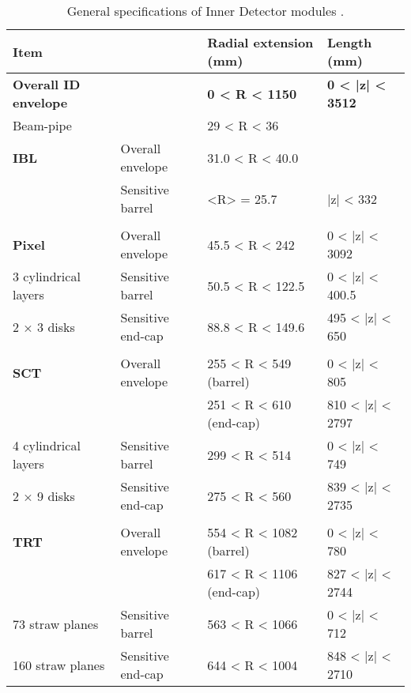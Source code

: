 \begin{table} \centering
\caption{General specifications of Inner Detector modules \cite{atlas_tdr} \cite{insertable_Blayer}.}
\label{tab:ID_specs}
\begin{tabular}{ |l l|l|l| }
    \hline
    \textbf{Item}                   & &       \textbf{Radial extension (mm)} & \textbf{Length (mm)} \\
    \hline
    \textbf{Overall ID envelope}    & &         \textbf{0 < R < 1150}        &\textbf{0 < |z| < 3512} \\
    Beam-pipe                       & &            29 < R < 36    & \\
    \hline

    \textbf{IBL}          &  Overall envelope  &  31.0 < R < 40.0          &             \\    
                          &  Sensitive barrel  &  <R> = 25.7               &  |z| < 332 \\    
    &&&\\
    \textbf{Pixel}        &  Overall envelope  &  45.5 < R < 242           &  0 < |z| < 3092 \\
    3 cylindrical layers  &  Sensitive barrel  &  50.5 < R < 122.5         &  0 < |z| < 400.5 \\
    2 × 3 disks           &  Sensitive end-cap &  88.8 < R < 149.6         &  495 < |z| < 650 \\
    &&&\\
    \textbf{SCT}          &  Overall envelope  &  255 < R < 549 (barrel)   &  0 < |z| < 805 \\
                          &                    &  251 < R < 610 (end-cap)  &  810 < |z| < 2797 \\
    4 cylindrical layers  &  Sensitive barrel  &  299 < R < 514            &  0 < |z| < 749 \\
    2 × 9 disks           &  Sensitive end-cap &  275 < R < 560            &  839 < |z| < 2735 \\
    &&&\\
    \textbf{TRT}          &  Overall envelope  &  554 < R < 1082 (barrel)  &  0 < |z| < 780 \\
                          &                    &  617 < R < 1106 (end-cap) &  827 < |z| < 2744 \\
    73 straw planes       &  Sensitive barrel  &  563 < R < 1066           &  0 < |z| < 712 \\
    160 straw planes      &  Sensitive end-cap &  644 < R < 1004           &  848 < |z| < 2710 \\
    \hline
\end{tabular} \end{table}
